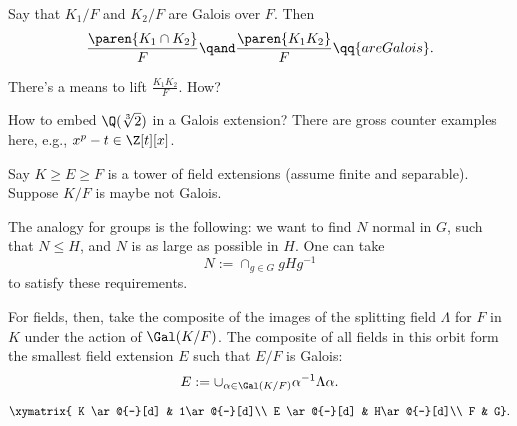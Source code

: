 \begin{prop}
    Say that $K_1/F$ and $K_2/F$ are Galois over $F$. Then 
    \[
        \frac{\paren{ K_1 \cap K_2 }}{F} \qand  \frac{\paren{ K_1 K_2 }}{F} \qq{are Galois}
    .\]
\end{prop}

\begin{coro}
   There's a means to lift $\frac{K_1 K_2}{F}$. How?
\end{coro}

How to embed $\Q(\sqrt[3]{2})$ in a Galois extension?
There are gross counter examples here, e.g., $x^p - t \in \Z[t][x]$.

\begin{defn}

    Say $K \ge E \ge F$ is a tower of field extensions (assume finite and separable). Suppose $K/F$ is maybe not Galois. 

    The analogy for groups is the following: we want to find $N$ normal in $G$, such that $N \le H$, and $N$ is as large as possible in $H$. One can take 
    \[
        N := \cap_{g \in G} gHg^{-1}
    \]
   to satisfy these requirements.  

   For fields, then, take the composite of the images of the splitting field $\Lambda$ for $F$ in $K$ under the action of $\Gal(K/F)$. The composite of all fields in this orbit form the smallest field extension $E$ such that $E/F$ is Galois:
    \[
        E := \cup_{\alpha \in \Gal(K/F)} \alpha^{-1} \Lambda \alpha
    .\]

\[
    \xymatrix{
        K \ar@{-}[d] & 1\ar@{-}[d]\\
        E \ar@{-}[d] & H\ar@{-}[d]\\
        F & G}
.\]
    
\end{defn}







